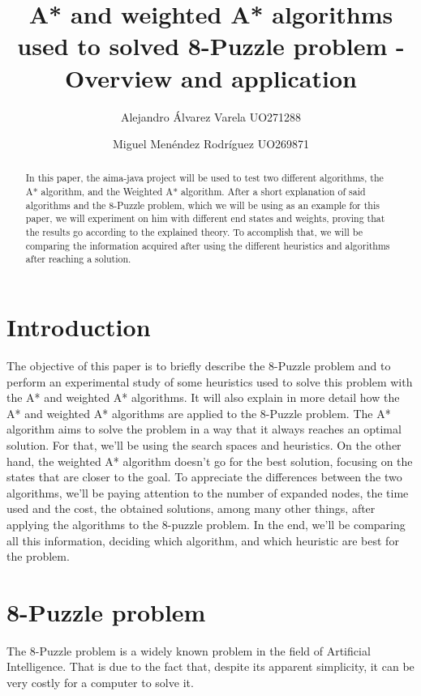 \documentclass[runningheads]{llncs}
\begin{document}
\title{A* and weighted A* algorithms used to solved 8-Puzzle problem - Overview and application}
%
\author{Alejandro Álvarez Varela UO271288\and
Miguel Menéndez Rodríguez UO269871}
\maketitle   
\begin{abstract}
In this paper, the aima-java project will be used to test two different algorithms, the A* algorithm, and the Weighted A* algorithm. After a short explanation of said algorithms and the 8-Puzzle problem, which we will be using as an example for this paper, we will experiment on him with different end states and weights, proving that the results go according to the explained theory. To accomplish that, we will be comparing the information acquired after using the different heuristics and algorithms after reaching a solution.
\end{abstract}

\section{Introduction}
The objective of this paper is to briefly describe the 8-Puzzle problem and to perform an experimental study of some heuristics used to solve this problem with the A* and weighted A* algorithms. It will also explain in more detail how the A* and weighted A* algorithms are applied to the 8-Puzzle problem.
The A* algorithm aims to solve the problem in a way that it always reaches an optimal solution. For that, we'll be using the search spaces and heuristics.
On the other hand, the weighted A* algorithm doesn't go for the best solution, focusing on the states that are closer to the goal.
To appreciate the differences between the two algorithms, we'll be paying attention to the number of expanded nodes, the time used and the cost, the obtained solutions, among many other things, after applying the algorithms to the 8-puzzle problem.
In the end, we'll be comparing all this information, deciding which algorithm, and which heuristic are best for the problem.


\section{8-Puzzle problem}
The 8-Puzzle problem is a widely known problem in the field of Artificial Intelligence. That is due to the fact that, despite its apparent simplicity, it can be very costly for a computer to solve it.
\end{document}
